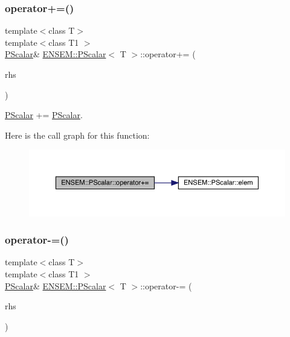 \subsubsection{\texorpdfstring{operator+=()}{operator+=()}\hspace{0.1cm}{\footnotesize\ttfamily [2/2]}}
{\footnotesize\ttfamily template$<$class T$>$ \\
template$<$class T1 $>$ \\
\mbox{\hyperlink{classENSEM_1_1PScalar}{P\+Scalar}}\& \mbox{\hyperlink{classENSEM_1_1PScalar}{E\+N\+S\+E\+M\+::\+P\+Scalar}}$<$ T $>$\+::operator+= (\begin{DoxyParamCaption}\item[{const \mbox{\hyperlink{classENSEM_1_1PScalar}{P\+Scalar}}$<$ T1 $>$ \&}]{rhs }\end{DoxyParamCaption})\hspace{0.3cm}{\ttfamily [inline]}}



\mbox{\hyperlink{classENSEM_1_1PScalar}{P\+Scalar}} += \mbox{\hyperlink{classENSEM_1_1PScalar}{P\+Scalar}}. 

Here is the call graph for this function\+:
\nopagebreak
\begin{figure}[H]
\begin{center}
\leavevmode
\includegraphics[width=350pt]{d3/d27/classENSEM_1_1PScalar_a9c8d9e51f9d0a13b4b4aa9992812eea8_cgraph}
\end{center}
\end{figure}
\mbox{\label{classENSEM_1_1PScalar_a8c0e633dbd87bcb922496bfaf136752c}} 
\subsubsection{\texorpdfstring{operator-\/=()}{operator-=()}\hspace{0.1cm}{\footnotesize\ttfamily [1/2]}}
{\footnotesize\ttfamily template$<$class T$>$ \\
template$<$class T1 $>$ \\
\mbox{\hyperlink{classENSEM_1_1PScalar}{P\+Scalar}}\& \mbox{\hyperlink{classENSEM_1_1PScalar}{E\+N\+S\+E\+M\+::\+P\+Scalar}}$<$ T $>$\+::operator-\/= (\begin{DoxyParamCaption}\item[{const \mbox{\hyperlink{classENSEM_1_1PScalar}{P\+Scalar}}$<$ T1 $>$ \&}]{rhs }\end{DoxyParamCaption})\hspace{0.3cm}{\ttfamily [inline]}}




